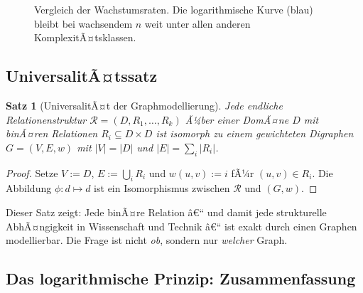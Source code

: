 ﻿\documentclass[12pt,a4paper,twoside]{article}
\theoremstyle{definition}
\theoremstyle{plain}
\newtheorem{theorem}{Satz}[section]
\theoremstyle{remark}
\begin{document}
\begin{figure}[h]
  \centering
  \caption{Vergleich der Wachstumsraten.  Die logarithmische Kurve
           (blau) bleibt bei wachsendem $n$ weit unter allen anderen
           KomplexitÃ¤tsklassen.}
  \label{fig:komplexitaet}
\end{figure}

\subsection{UniversalitÃ¤tssatz}

\begin{theorem}[UniversalitÃ¤t der Graphmodellierung]
\label{thm:universal}
Jede endliche Relationenstruktur $\mathcal{R} = (D, R_1, \ldots, R_k)$
Ã¼ber einer DomÃ¤ne $D$ mit binÃ¤ren Relationen $R_i \subseteq D \times D$
ist isomorph zu einem gewichteten Digraphen $G=(V,E,w)$ mit
$|V|=|D|$ und $|E|=\sum_i |R_i|$.
\end{theorem}

\begin{proof}
Setze $V := D$, $E := \bigcup_i R_i$ und $w(u,v) := i$ fÃ¼r
$(u,v) \in R_i$.  Die Abbildung $\phi: d \mapsto d$ ist ein
Isomorphismus zwischen $\mathcal{R}$ und $(G,w)$.
\end{proof}

\noindent
Dieser Satz zeigt: Jede binÃ¤re Relation â€“ und damit jede
strukturelle AbhÃ¤ngigkeit in Wissenschaft und Technik â€“ ist
exakt durch einen Graphen modellierbar.  Die Frage ist nicht
\emph{ob}, sondern nur \emph{welcher} Graph.

\subsection{Das logarithmische Prinzip: Zusammenfassung}
\end{document}
